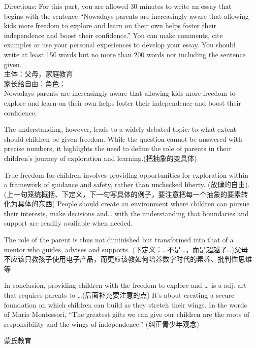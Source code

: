 Directions: For this part, you are allowed 30 minutes to write an essay that begins with the sentence 
“Nowadays parents are increasingly aware that allowing kids more freedom to explore and learn on their own helps foster their independence and boost their confidence.” 
You can make comments, cite examples or use your personal experiences to develop your essay. 
You should write at least 150 words but no more than 200 words not including the sentence given.
~\\


主体：父母，家庭教育
~\\


家长给自由：角色：
~\\


Nowadays parents are increasingly aware that allowing kids more freedom to explore and learn on their own 
helps foster their independence and boost their confidence. 


The understanding, however, leads to a widely debated topic: to what extent should children be given freedom. 
While the question cannot be answered with precise numbers, it highlights the need to define the role of parents in their children’s journey of exploration and learning.(把抽象的变具体)


True freedom for children involves providing opportunities for exploration within a framework of guidance and safety, rather than unchecked liberty.
(放肆的自由). (上一句笼统概括、下定义，下一句写具体的例子，要注意把每一个抽象的要素转化为具体的东西)
People should create an environment where children can pursue their interests, make decisions and… 
with the understanding that boundaries and support are readily available when needed.


The role of the parent is thus not diminished but transformed into that of a mentor who guides, advises and supports.
(下定义：…不是…，而是超越了…)父母不应该只教孩子使用电子产品，而更应该教如何培养数字时代的素养、批判性思维等


In conclusion, providing children with the freedom to explore and … is a adj. art that requires parents to …(后面补充要注意的点) 
It’s about creating a secure foundation on which children can build as they stretch their wings. In the words of Maria Montessori, 
“The greatest gifts we can give our children are the roots of responsibility and the wings of independence.” (纠正青少年观念)


蒙氏教育